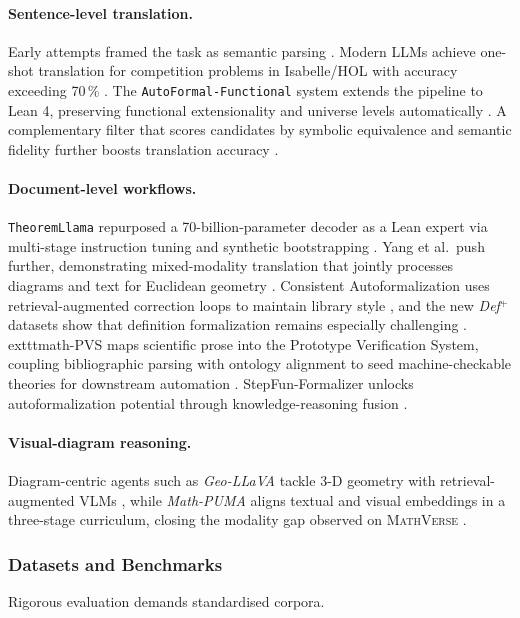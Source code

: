 \documentclass[acmsmall,anonymous]{acmart}
\begin{document}
\paragraph{Sentence-level translation.}
Early attempts framed the task as semantic parsing \cite{wang2018first}.  Modern LLMs achieve one-shot translation for competition problems in Isabelle/HOL with accuracy exceeding 70\,\% \cite{wu2022autoformalization}.  The \texttt{AutoFormal-Functional} system extends the pipeline to Lean 4, preserving functional extensionality and universe levels automatically \cite{buali2024towards}. A complementary filter that scores candidates by symbolic equivalence and semantic fidelity further boosts translation accuracy \cite{li2024symbolicautoformal}.

\paragraph{Document-level workflows.}
\texttt{TheoremLlama} repurposed a 70-billion-parameter decoder as a Lean expert via multi-stage instruction tuning and synthetic bootstrapping \cite{gu2024theoremllama}.  Yang et al.\ push further, demonstrating mixed-modality translation that jointly processes diagrams and text for Euclidean geometry \cite{wu2022autoformalization,murphy2024autoformalizing}. Consistent Autoformalization uses retrieval-augmented correction loops to maintain library style \cite{zhang2024consistentautoformal}, and the new \textit{Def$^{+}$} datasets show that definition formalization remains especially challenging \cite{zhang2025definitions}. 	exttt{math-PVS} maps scientific prose into the Prototype Verification System, coupling bibliographic parsing with ontology alignment to seed machine-checkable theories for downstream automation \cite{saidi-2023-mathpvs}. StepFun-Formalizer unlocks autoformalization potential through knowledge-reasoning fusion \cite{wu2025stepfunformalizer}.

\paragraph{Visual-diagram reasoning.} Diagram-centric agents such as \emph{Geo-LLaVA} tackle 3-D geometry with retrieval-augmented VLMs \cite{gao2024geollava}, while \emph{Math-PUMA} aligns textual and visual embeddings in a three-stage curriculum, closing the modality gap observed on \textsc{MathVerse} \cite{zhuang2025mathpuma}.

\subsubsection{Datasets and Benchmarks}\label{sec:datasets}
Rigorous evaluation demands standardised corpora.
\end{document}
